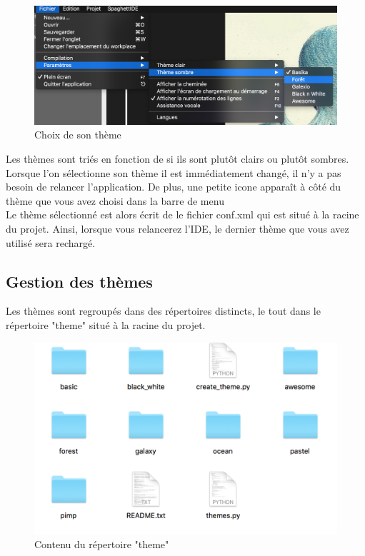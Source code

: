 \documentclass[a4paper,12pt]{article}
\begin{document}
			\begin{figure}[h!]
				\begin{center}
					\includegraphics[scale=0.5]{images/imgs_themes/choix_theme}
					\caption{Choix de son thème}
				\end{center}
			\end{figure}
			
			Les thèmes sont triés en fonction de si ils sont plutôt clairs ou plutôt sombres.\\
			Lorsque l'on sélectionne son thème il est immédiatement changé, il n'y a pas besoin de relancer l'application. De plus, une petite icone apparaît à côté du thème que vous avez choisi dans la barre de menu\\
			
			Le thème sélectionné est alors écrit de le fichier conf.xml qui est situé à la racine du projet. Ainsi, lorsque vous relancerez l'IDE, le dernier thème que vous avez utilisé sera rechargé.
			
		\subsection{Gestion des thèmes}
		
			Les thèmes sont regroupés dans des répertoires distincts, le tout dans le répertoire "theme" situé à la racine du projet. 
			\begin{figure}[h!]
				\begin{center}
					\includegraphics[scale=0.7]{images/imgs_themes/themes}
					\caption{Contenu du répertoire "theme"}
				\end{center}
			\end{figure}
			
\end{document}
